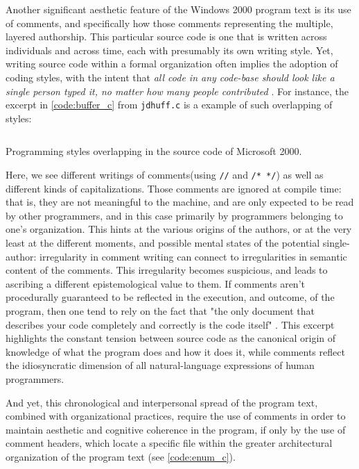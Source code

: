 Another significant aesthetic feature of the Windows 2000 program text is its use of comments, and specifically how those comments representing the multiple, layered authorship. This particular source code is one that is written across individuals and across time, each with presumably its own writing style. Yet, writing source code within a formal organization often implies the adoption of coding styles, with the intent that \emph{all code in any code-base should look like a single person typed it, no matter how many people contributed} \citep{waldron_idiomatic_2020}. For instance, the excerpt in \ref{code:buffer_c} from \lstinline{jdhuff.c} is a example of such overlapping of styles:

\begin{listing}
  \inputminted[fontsize=\footnotesize]{c}{./corpus/buffer.c}
  \caption{Programming styles overlapping in the source code of Microsoft 2000.}
  \label{code:buffer_c}
\end{listing}

Here, we see different writings of comments(using \lstinline{//} and \lstinline{/* */}) as well as  different kinds of capitalizations. Those comments are ignored at compile time: that is, they are not meaningful to the machine, and are only expected to be read by other programmers, and in this case primarily by programmers belonging to one's organization. This hints at the various origins of the authors, or at the very least at the different moments, and possible mental states of the potential single-author: irregularity in comment writing can connect to irregularities in semantic content of the comments. This irregularity becomes suspicious, and leads to ascribing a different epistemological value to them. If comments aren't procedurally guaranteed to be reflected in the execution, and outcome, of the program, then one tend to rely on the fact that "the only document that describes your code completely and correctly is the code itself" \citep{goodliffe_code_2007}. This excerpt highlights the constant tension between source code as the canonical origin of knowledge of what the program does and how it does it, while comments reflect the idiosyncratic dimension of all natural-language expressions of human programmers.

And yet, this chronological and interpersonal spread of the program text, combined with organizational practices, require the use of comments in order to maintain aesthetic and cognitive coherence in the program, if only by the use of comment headers, which locate a specific file within the greater architectural organization of the program text (see \ref{code:enum_c}).


